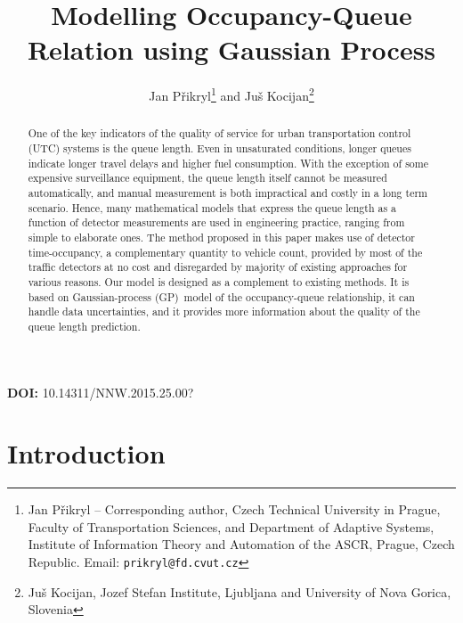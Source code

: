 \documentclass[twoside]{nnw}
\begin{document}
\title{Modelling Occupancy-Queue Relation using Gaussian Process}

\author{%
    Jan Přikryl\thanks{Jan Přikryl -- Corresponding author, Czech Technical University in Prague, Faculty of Transportation Sciences, and Department of Adaptive Systems, Institute of Information Theory and Automation of the ASCR, Prague, Czech Republic. Email: \texttt{prikryl@fd.cvut.cz}}
    and
    Juš Kocijan\thanks{Juš Kocijan, Jozef Stefan Institute, Ljubljana and University of Nova Gorica, Slovenia}%
}

\maketitle

\begin{abstract}
%
One of the key indicators of the quality of service for urban transportation
control (UTC) systems is the queue length. Even in unsaturated conditions,
longer queues indicate longer travel delays and higher fuel consumption.
With the exception of some expensive surveillance equipment, the queue length
itself cannot be measured automatically, and manual measurement is both
impractical and costly in a long term scenario. Hence, many mathematical models
that express the queue length as a function of detector measurements are used
in engineering practice, ranging from simple to elaborate ones.  The method
proposed in this paper makes use of detector time-occupancy, a complementary
quantity to vehicle count, provided by most of the traffic detectors at no cost
and disregarded by majority of existing approaches for various reasons. Our model
is designed as a complement to existing methods. It is based on Gaussian-process
(GP)~model of the occupancy-queue relationship, it can handle data uncertainties,
and it provides more information about the quality of the queue length prediction.
%
\end{abstract}


 \hfill  \textbf{DOI:} 10.14311/NNW.2015.25.00?


\section{Introduction}
\end{document}
